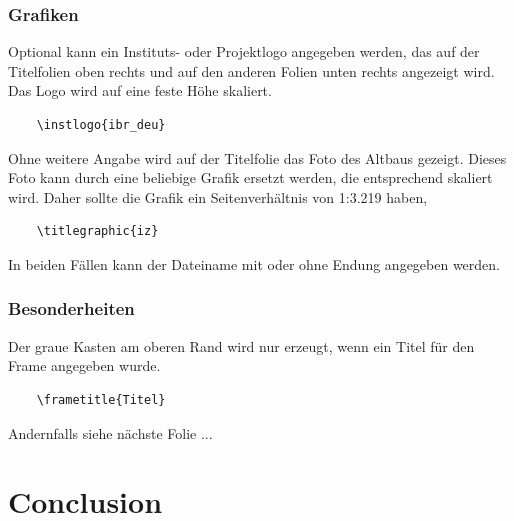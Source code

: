 \documentclass[table,hyperref={bookmarksopen=false}]{beamer}
\begin{document}
\begin{frame}[fragile]
  \frametitle{Grafiken}
  Optional kann ein Instituts- oder Projektlogo angegeben werden, das auf der Titelfolien oben rechts und auf den anderen Folien unten rechts angezeigt wird.
  Das Logo wird auf eine feste Höhe skaliert.
  \begin{verbatim}
    \instlogo{ibr_deu}
  \end{verbatim}
  Ohne weitere Angabe wird auf der Titelfolie das Foto des Altbaus gezeigt. Dieses Foto kann durch eine beliebige Grafik ersetzt werden, die entsprechend skaliert wird. Daher sollte die Grafik ein Seitenverhältnis von 1:3.219 haben,
  \begin{verbatim}
    \titlegraphic{iz}
  \end{verbatim}
  In beiden Fällen kann der Dateiname mit oder ohne Endung angegeben werden.
\end{frame}

\begin{frame}[fragile]
  \frametitle{Besonderheiten}
  Der graue Kasten am oberen Rand wird nur erzeugt, wenn ein Titel für den Frame angegeben wurde.
  \begin{verbatim}
    \frametitle{Titel}
  \end{verbatim}
  Andernfalls siehe nächste Folie ...
\end{frame}

\section{Conclusion}

        
\end{document}
